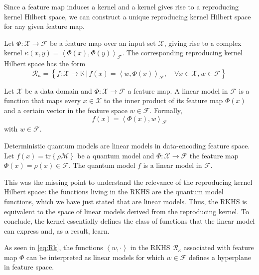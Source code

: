 Since a feature map induces a kernel and a kernel gives rise to a reproducing kernel Hilbert space, we can construct a unique reproducing kernel Hilbert space for any given feature map.

\begin{teorema}\label{th:kernel->RKHS}
    Let $\Phi:\mathcal{X} \longrightarrow \mathcal{F}$ be a feature map over an input set $\mathcal{X}$, giving rise to a complex kernel $\kappa(x,y)=\left<\Phi(x),\Phi(y) \right>_{\mathcal{F}}$. The corresponding reproducing kernel Hilbert space has the form 
    \begin{equation} \label{eq:Rk}
        \mathcal{R}_{\kappa} = \left\lbrace f: \mathcal{X} \longrightarrow \mathbb{K} \,|\, f(x) = \left< w, \Phi(x) \right>_{\mathcal{F}}, \quad \forall x\in \mathcal{X}, w \in \mathcal{F} \right\rbrace
    \end{equation}
\end{teorema}

\begin{definicion}
    Let $\mathcal{X}$ be a data domain and $\Phi: \mathcal{X} \longrightarrow \mathcal{F}$ a feature map. A linear model in $\mathcal{F}$ is a function that maps every $x \in \mathcal{X}$ to the inner product of its feature map $\Phi(x)$ and a certain vector in the feature space $w \in \mathcal{F}$. Formally,
    $$f(x) = \left< \Phi(x), w \right>_{\mathcal{F}}$$ with $w \in \mathcal{F}$.
\end{definicion}

\begin{teorema}
    Deterministic quantum models are linear models in data-encoding feature space. Let $f(x)=\mathrm{tr} \left\lbrace \rho \mathcal{M} \right\rbrace$ be a quantum model and $\Phi: \mathcal{X} \longrightarrow \mathcal{F}$ the feature map $\Phi(x)=\rho(x) \in \mathcal{F}$. The quantum model $f$ is a linear model in $\mathcal{F}$.
\end{teorema}

This was the missing point to understand the relevance of the reproducing kernel Hilbert space: the functions living in the RKHS are the quantum model functions, which we have just stated that are linear models. Thus, the RKHS is equivalent to the space of linear models derived from the reproducing kernel. To conclude, the kernel essentially defines the class of functions that the linear model can express and, as a result, learn.

As seen in \autoref{eq:Rk}, the functions $\left< w, \cdot \right>$ in the RKHS $\mathcal{R}_{\kappa}$  associated with feature map $\Phi$ can be interpreted as linear models for which $w \in \mathcal{F}$ defines a hyperplane in feature space. 


